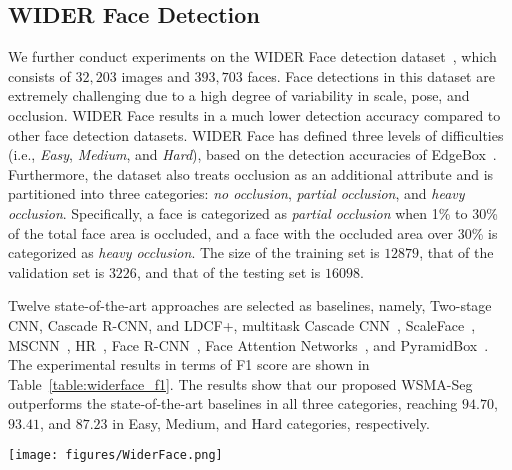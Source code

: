 \documentclass{article}
\begin{document}
\subsection{WIDER Face Detection}
We further conduct experiments on the WIDER Face detection dataset~\cite{yang2016wider}, which consists of $32,203$ images and $393,703$ faces. Face detections in this dataset are extremely challenging due to a high degree of variability in scale, pose, and occlusion. WIDER Face results in a much lower detection accuracy compared to other face detection datasets. WIDER Face has defined three levels of difficulties (i.e., \textit{Easy}, \textit{Medium}, and \textit{Hard}),  based on the detection accuracies of EdgeBox~\cite{zitnick2014edge}. 
Furthermore, the dataset also treats occlusion as an additional attribute and is partitioned into three categories: \textit{no occlusion}, \textit{partial occlusion}, and \textit{heavy occlusion}. Specifically, a face is categorized as \textit{partial occlusion} when 1\% to 30\% of the total face area is occluded, and a face with the occluded area over 30\% is categorized as \textit{heavy occlusion}. The size of the training set is $12879$, that of the validation set is $3226$, and that of the testing set is $16098$.


Twelve state-of-the-art approaches are selected as baselines, namely, Two-stage CNN, Cascade R-CNN, and LDCF+\cite{ohn2016boost}, multitask Cascade CNN~\cite{zhang2016joint}, ScaleFace~\cite{yang2017face}, MSCNN~\cite{cai2016unified}, HR~\cite{hu2017finding}, Face R-CNN~\cite{wang2017detecting}, Face Attention Networks~\cite{wang2017face}, and PyramidBox~\cite{tang2018pyramidbox}.
The experimental results in terms of F1 score are shown in Table~\ref{table:widerface_f1}.
The results show that our proposed WSMA-Seg outperforms the state-of-the-art baselines in all three categories, reaching $94.70$, $93.41$, and $87.23$ in Easy, Medium, and Hard categories, respectively.




\begin{figure*}
  \centering
  \texttt{[image: figures/WiderFace.png]}
  \caption{F1 scores on the WIDER Face dataset.\label{table:widerface_f1}}
\end{figure*}
\end{document}
